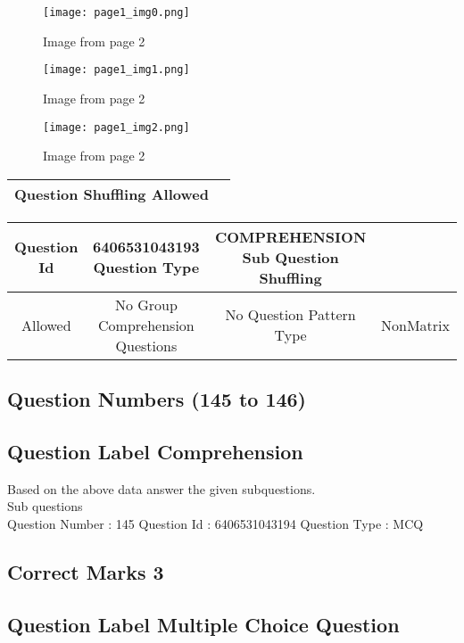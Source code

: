 \documentclass{article}
\begin{document}
\newpage
\begin{figure}[h]
\centering
\texttt{[image: page1\_img0.png]}
\caption{Image from page 2}
\end{figure}

\begin{figure}[h]
\centering
\texttt{[image: page1\_img1.png]}
\caption{Image from page 2}
\end{figure}

\begin{figure}[h]
\centering
\texttt{[image: page1\_img2.png]}
\caption{Image from page 2}
\end{figure}

\begin{longtable}{|c|c|}
\hline
\textbf{Question Shuffling Allowed} & \textbf{} \\ \hline
\end{longtable}

\begin{longtable}{|c|c|c|c|}
\hline
\textbf{Question Id} & \textbf{6406531043193 Question Type} & \textbf{COMPREHENSION Sub Question Shuffling} & \textbf{} \\ \hline
Allowed & No Group Comprehension Questions & No Question Pattern Type & NonMatrix \\ \hline
\end{longtable}

\subsection{Question Numbers  (145 to 146)}

\subsection{Question Label  Comprehension}

Based on the above data answer the given subquestions.\\

Sub questions\\

Question Number : 145 Question Id : 6406531043194 Question Type : MCQ\\

\subsection{Correct Marks  3}

\subsection{Question Label  Multiple Choice Question}
\end{document}
